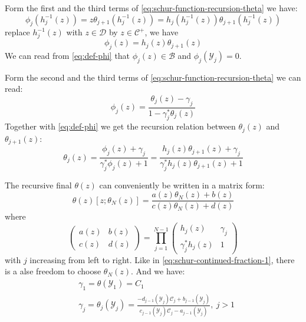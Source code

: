 \documentclass[
	preprint,%
	aps,
	prb,
	showpacs,	
	amsmath, amssymb]{revtex4-2}
\newcommand{\Y}{ {\mathcal{Y}} }
\newcommand{\C}{ {\mathcal{C}} }
\newcommand{\D}{ {\mathcal{D}} }
\newcommand{\B}{ {\mathcal{B}} }
\begin{document}
Form the first and the third terms of \cref{eq:schur-function-recursion-theta}
we have:
\begin{equation}
	\phi_j(h_j^{-1}(z)) = z\theta_{j+1}(h_j^{-1}(z)) 
	=h_j(h_j^{-1}(z)) \theta_{j+1}(h_j^{-1}(z)) 
\end{equation}
replace $h_j^{-1}(z)$ with $z\in\D$ by $z \in \C^+$, we have
\begin{equation}\label{eq:def-phi}
	\phi_j(z) =h_j(z) \theta_{j+1}(z) 
\end{equation}
We can read from \cref{eq:def-phi} that $\phi_j(z) \in \B$ 
and $\phi_j(\Y_j) = 0$.

Form the second and the third terms of \cref{eq:schur-function-recursion-theta}
we can read:
\begin{equation}\label{eq:phi-theta-j}
	\phi_j(z)
	= \frac{\theta_j(z) - \gamma_j}{1 - \gamma_j^* \theta_j(z)}
\end{equation}
Together with \cref{eq:def-phi} we get the recursion relation between 
$\theta_j(z)$ and $\theta_{j+1}(z)$:
\begin{equation}\label{eq:recursion-relation-theta}
	\theta_j(z) = \frac{\phi_j(z) + \gamma_j}{\gamma_j^*\phi_j(z)+1}
		= \frac{h_j(z) \theta_{j+1}(z)  + \gamma_j}
			{\gamma_j^*h_j(z) \theta_{j+1}(z) +1}
\end{equation}

The recursive final $\theta(z)$ can conveniently be written in a
matrix form:
\begin{equation}\label{eq:recursive-theta}
	\theta(z)[z;\theta_N(z)] 
		= \frac{a(z)\theta_N(z) + b(z)}{c(z)\theta_N(z) + d(z)}
\end{equation}
where
\begin{equation}\label{eq:factor-matrix}
	\left(
		\begin{matrix}
			a(z) & b(z) \\
			c(z) & d(z)
		\end{matrix}
	\right) = \prod_{j=1}^{N-1}
	\left(
		\begin{matrix}
			h_j(z)            & \gamma_j \\
			\gamma_j^* h_j(z) & 1
		\end{matrix}
	\right)
\end{equation}
with $j$ increasing from left to right. Like in \cref{eq:schur-continued-fraction-1}, 
there is a alse freedom to choose $\theta_N(z)$. And we have:
\begin{align}
	\label{eq:schur-parameter-1}
	&\gamma_1 = \theta(\Y_1) = C_1 \\
	\label{eq:schur-parameter-2}
	&\gamma_j = \theta_j(\Y_j)
	= \frac{-d_{j-1}(\Y_j) \C_j + b_{j-1}(\Y_j)}
		{c_{j-1}(\Y_j) \C_j - a_{j-1}(\Y_j)}
		, \ j>1
\end{align}
\end{document}
